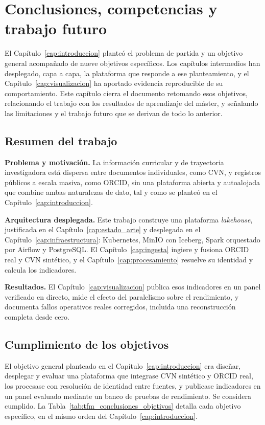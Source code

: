 \chapter{Conclusiones, competencias y trabajo futuro}
\label{cap:conclusiones}

El Capítulo~\ref{cap:introduccion} planteó el problema de partida y un
objetivo general acompañado de nueve objetivos específicos. Los capítulos
intermedios han desplegado, capa a capa, la plataforma que responde a ese
planteamiento, y el Capítulo~\ref{cap:visualizacion} ha aportado evidencia
reproducible de su comportamiento. Este capítulo cierra el documento
retomando esos objetivos, relacionando el trabajo con los resultados de
aprendizaje del máster, y señalando las limitaciones y el trabajo futuro
que se derivan de todo lo anterior.

\section{Resumen del trabajo}
\label{sec:conclusiones_resumen}

\textbf{Problema y motivación.} La información curricular y de trayectoria
investigadora está dispersa entre documentos individuales, como CVN, y
registros públicos a escala masiva, como ORCID, sin una plataforma
abierta y autoalojada que combine ambas naturalezas de dato, tal y como se
planteó en el Capítulo~\ref{cap:introduccion}.

\textbf{Arquitectura desplegada.} Este trabajo construye una plataforma
\textit{lakehouse}, justificada en el Capítulo~\ref{cap:estado_arte} y
desplegada en el Capítulo~\ref{cap:infraestructura}: Kubernetes, MinIO con
Iceberg, Spark orquestado por Airflow y PostgreSQL. El
Capítulo~\ref{cap:ingesta} ingiere y fusiona ORCID real y CVN sintético, y
el Capítulo~\ref{cap:procesamiento} resuelve su identidad y calcula los
indicadores.

\textbf{Resultados.} El Capítulo~\ref{cap:visualizacion} publica esos
indicadores en un panel verificado en directo, mide el efecto del
paralelismo sobre el rendimiento, y documenta fallos operativos reales
corregidos, incluida una reconstrucción completa desde cero.

\section{Cumplimiento de los objetivos}
\label{sec:conclusiones_objetivos}

El objetivo general planteado en el Capítulo~\ref{cap:introduccion} era
diseñar, desplegar y evaluar una plataforma que integrase CVN sintético y
ORCID real, los procesase con resolución de identidad entre fuentes, y
publicase indicadores en un panel evaluado mediante un banco de pruebas de
rendimiento. Se considera cumplido. La Tabla~\ref{tab:tfm_conclusiones_objetivos}
detalla cada objetivo específico, en el mismo orden del
Capítulo~\ref{cap:introduccion}.

